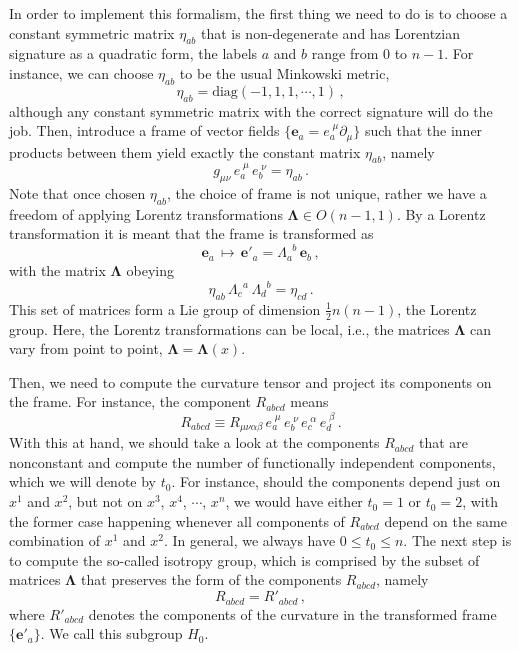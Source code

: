 \documentclass[twocolumn,prd,aps,showpacs,showkeys,amsmath,amssymb]{revtex4-1}
\begin{document}
In order to implement this formalism, the first thing we need to do is to choose a constant symmetric matrix  $\eta_{ab}$  that is non-degenerate and has Lorentzian signature as a quadratic form, the labels $a$ and $b$ range from $0$ to $n-1$. For instance, we can choose $\eta_{ab}$ to be the usual Minkowski metric,
$$ \eta_{ab}=\textrm{diag}(-1,1,1,\cdots,1) \,, $$
although any constant symmetric matrix with the correct signature will do the job. Then, introduce a frame of vector fields $\{\mathbf{e}_a = e_a^{\;\mu}\partial_\mu\}$ such that the inner products between them yield exactly the constant matrix $\eta_{ab}$, namely
\begin{equation}\label{eta}
  g_{\mu\nu}\,  e_a^{\;\mu}\, e_b^{\;\nu} = \eta_{ab}\,.
\end{equation}
Note that once chosen $\eta_{ab}$, the choice of frame is not unique, rather we have a freedom of applying Lorentz transformations $\mathbf{\Lambda}\in O(n-1,1)$. By a Lorentz transformation it is meant that the frame is transformed as
\begin{equation}\label{e'}
  \textbf{e}_a\, \mapsto \, \textbf{e}'_a = \Lambda_a^{\;\;b} \, \textbf{e}_b \,,
\end{equation}
with the matrix $\mathbf{\Lambda}$ obeying
$$ \eta_{ab}  \,\Lambda_c^{\;\;a} \,\Lambda_d^{\;\;b} = \eta_{cd}\,.  $$
This set of matrices form a Lie group of dimension $\frac{1}{2}n(n-1)$, the Lorentz group. Here, the Lorentz transformations can be local, i.e., the matrices $\mathbf{\Lambda}$ can vary from point to point, $\mathbf{\Lambda} = \mathbf{\Lambda}(x) $.



Then, we need to compute the curvature tensor and project its components on the frame. For instance, the component $R_{abcd}$ means
\begin{equation*}
  R_{abcd} \equiv R_{\mu\nu\alpha\beta}\,e_a^{\;\mu}\, e_b^{\;\nu}\,e_c^{\;\alpha}\, e_d^{\;\beta}\,.
\end{equation*}
With this at hand, we should take a look at the components $R_{abcd}$ that are nonconstant and compute the number of functionally independent components, which we will denote by $t_0$. For instance, should the components depend just on $x^1$ and $x^2$, but not on $x^3$, $x^4$, $\cdots$, $x^n$, we would have either $t_0=1$ or $t_0=2$, with the former case happening whenever all components of $R_{abcd}$ depend on the same combination of $x^1$ and $x^2$. In general, we always have $0\leq t_0\leq n$. The next step is to compute the so-called isotropy group, which is comprised by the subset of matrices $\mathbf{\Lambda}$ that preserves the form of the components $R_{abcd}$, namely
\begin{equation*}
  R_{abcd} =   R'_{abcd} \,,
\end{equation*}
where $R'_{abcd}$ denotes the components of the curvature in the transformed frame $\{\textbf{e}'_a\}$. We call this subgroup $H_0$.
\end{document}
